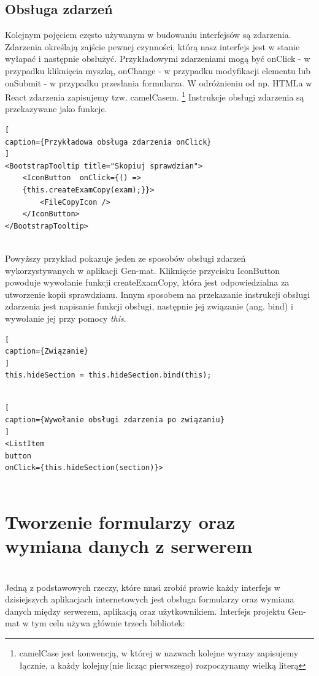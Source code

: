 \documentclass[oneside,polski,logo,indent]{amuthesis}
\begin{document}
\subsection{Obsługa zdarzeń}
{
Kolejnym pojęciem często używanym w budowaniu interfejsów są zdarzenia. Zdarzenia określają zajście pewnej czynności, którą nasz interfejs jest w stanie wyłapać i następnie obsłużyć.
Przykładowymi zdarzeniami mogą być onClick - w przypadku kliknięcia myszką, onChange - w przypadku modyfikacji elementu lub onSubmit - w przypadku przesłania formularza.
W odróżnieniu od np. HTMLa w React zdarzenia zapisujemy tzw. camelCasem. \footnote{camelCase jest konwencją, w której w nazwach kolejne wyrazy zapisujemy łącznie, a każdy kolejny(nie licząc pierwszego) rozpoczynamy wielką literą}
Instrukcje obsługi zdarzenia są przekazywane jako funkcje.


\begin{lstlisting}[
caption={Przykładowa obsługa zdarzenia onClick}
]
<BootstrapTooltip title="Skopiuj sprawdzian">
	<IconButton  onClick={() => 
	{this.createExamCopy(exam);}}>
		<FileCopyIcon />
	</IconButton>
</BootstrapTooltip>


\end{lstlisting}

}
Powyższy przykład pokazuje jeden ze sposobów obsługi zdarzeń wykorzystywanych w aplikacji Gen-mat. Kliknięcie przycisku IconButton powoduje wywołanie funkcji createExamCopy, która jest odpowiedzialna za utworzenie kopii sprawdzianu.
Innym sposobem na przekazanie instrukcji obsługi zdarzenia jest napisanie funkcji obsługi, następnie jej związanie (ang. bind) i wywołanie jej przy pomocy {\it this}.


\begin{lstlisting}[
caption={Związanie}
]
this.hideSection = this.hideSection.bind(this);


\end{lstlisting}

\begin{lstlisting}[
caption={Wywołanie obsługi zdarzenia po związaniu}
]
<ListItem
button 
onClick={this.hideSection(section)}>


\end{lstlisting}



\section{Tworzenie formularzy oraz wymiana danych z serwerem} \mbox{}\\
Jedną z podstawowych rzeczy, które musi zrobić prawie każdy interfejs w dzisiejszych aplikacjach internetowych jest obsługa formularzy oraz wymiana danych między serwerem, aplikacją oraz użytkownikiem. Interfejs projektu Gen-mat w tym celu używa głównie trzech bibliotek:\newpage
\end{document}
